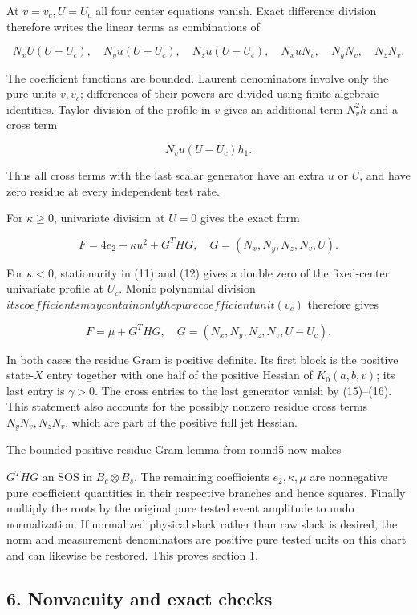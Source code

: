 At \(v=v_c,U=U_c\) all four center equations vanish. Exact difference
division therefore writes the linear terms as combinations of

\[
N_x U(U-U_c),\quad N_yu(U-U_c),\quad N_zu(U-U_c),
\quad N_xuN_v,\quad N_yN_v,\quad N_zN_v.
\tag{15}
\]

The coefficient functions are bounded. Laurent denominators involve only
the pure units \(v,v_c\); differences of their powers are divided using
finite algebraic identities. Taylor division of the profile in \(v\)
gives an additional term \(N_v^2h\) and a cross term

\[
N_vu(U-U_c)h_1.
\tag{16}
\]

Thus all cross terms with the last scalar generator have an extra \(u\)
or \(U\), and have zero residue at every independent test rate.

For \(\kappa\ge0\), univariate division at \(U=0\) gives the exact form

\[
F=4e_2+\kappa u^2+G^T H G,
\quad G=(N_x,N_y,N_z,N_v,U).
\tag{17}
\]

For \(\kappa<0\), stationarity in (11) and (12) gives a double zero of
the fixed-center univariate profile at \(U_c\). Monic polynomial division
\(its coefficients may contain only the pure coefficient unit (v_c)\)
therefore gives

\[
F=\mu+G^THG,
\quad G=(N_x,N_y,N_z,N_v,U-U_c).
\tag{18}
\]

In both cases the residue Gram is positive definite. Its first block is
the positive state-\(X\) entry together with one half of the positive
Hessian of \(K_0(a,b,v)\); its last entry is \(\gamma>0\). The cross entries
to the last generator vanish by (15)--(16). This statement also accounts
for the possibly nonzero residue cross terms \(N_yN_v,N_zN_v\), which are
part of the positive full jet Hessian.

The bounded positive-residue Gram lemma from round5 now makes

\(G^THG\) an SOS in \(B_c\otimes B_s\). The remaining coefficients
\(e_2,\kappa,\mu\) are nonnegative pure coefficient quantities in their
respective branches and hence squares. Finally multiply the roots by the
original pure tested event amplitude to undo normalization. If normalized
physical slack rather than raw slack is desired, the norm and measurement
denominators are positive pure tested units on this chart and can likewise
be restored. This proves section 1.

\hypertarget{nonvacuity-and-exact-checks}{%
\subsection{6. Nonvacuity and exact checks}\label{p4ec1a51262f9:nonvacuity-and-exact-checks}}

